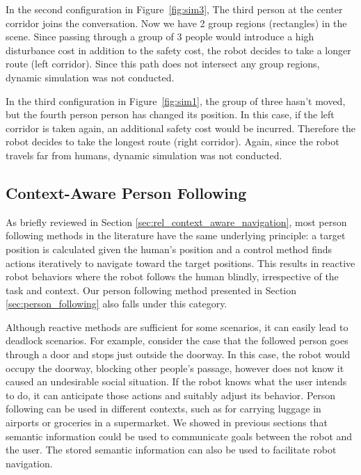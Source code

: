 \documentclass[3p]{elsarticle}
\begin{document}
In the second configuration in Figure~\ref{fig:sim3}, The third person at the center corridor joins the conversation. Now we have 2 group regions (rectangles) in the scene. Since passing through a group of 3 people would introduce a high disturbance cost in addition to the safety cost, the robot decides to take a longer route (left corridor). Since this path does not intersect any group regions, dynamic simulation was not conducted.

In the third configuration in Figure~\ref{fig:sim1}, the group of three hasn't moved, but the fourth person person has changed its position. In this case, if the left corridor is taken again, an additional safety cost would be incurred. Therefore the robot decides to take the longest route (right corridor). Again, since the robot travels far from humans, dynamic simulation was not conducted.

\subsection{Context-Aware Person Following}
\label{sec:context_aware_person_following}

As briefly reviewed in Section \ref{sec:rel_context_aware_navigation}, most person following methods in the literature have the same underlying principle: a target position is calculated given the human's position and a control method finds actions iteratively to navigate toward the target positions. This results in reactive robot behaviors where the robot follows the human blindly, irrespective of the task and context. Our person following method presented in Section \ref{sec:person_following} also falls under this category.

Although reactive methods are sufficient for some scenarios, it can easily lead to deadlock scenarios. For example, consider the case that the followed person goes through a door and stops just outside the doorway. In this case, the robot would occupy the doorway, blocking other people's passage, however does not know it caused an undesirable social situation. If the robot knows what the user intends to do, it can anticipate those actions and suitably adjust its behavior. Person following can be used in different contexts, such as for carrying luggage in airports or groceries in a supermarket. We showed in previous sections that semantic information could be used to communicate goals between the robot and the user. The stored semantic information can also be used to facilitate robot navigation.
\end{document}
